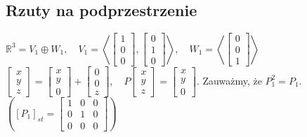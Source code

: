 \documentclass[../main.tex]{subfiles}
\begin{document}
\subsection{Rzuty na podprzestrzenie}
\begin{przyklad}
    $\mathbb{R}^3 = V_1 \oplus W_1, \quad V_1 = \left< \begin{bmatrix} 1\\0\\0 \end{bmatrix} , \begin{bmatrix} 0\\1\\0 \end{bmatrix}  \right>, \quad W_1 = \left< \begin{bmatrix} 0\\0\\1 \end{bmatrix}  \right>$\\
    $\begin{bmatrix} x\\y\\z \end{bmatrix} = \begin{bmatrix} x\\y\\0 \end{bmatrix} + \begin{bmatrix} 0\\0\\z \end{bmatrix}, \quad P \begin{bmatrix} x\\y\\z \end{bmatrix} = \begin{bmatrix} x\\y\\0 \end{bmatrix}$. Zauważmy, że $P_1^2 = P_1$. $\left( [P_1]_{st}= \begin{bmatrix} 1&0&0\\0&1&0\\0&0&0 \end{bmatrix}  \right) $
\end{przyklad}
\end{document}
